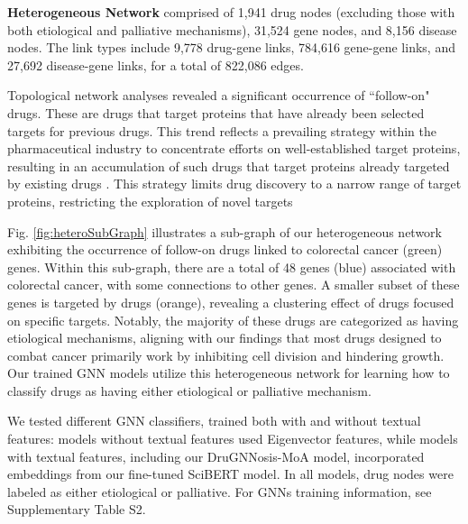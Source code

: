 \documentclass[journal,twoside,web]{ieeecolor}
\begin{document}
\textbf{Heterogeneous Network}
comprised of 1,941 drug nodes (excluding those with both etiological and palliative mechanisms), 31,524 gene nodes, and 8,156 disease nodes.
The link types include 9,778 drug-gene links, 784,616 gene-gene links, and 27,692 disease-gene links, for a total of 822,086 edges.

Topological network analyses revealed a significant occurrence of ``follow-on" drugs.
These are drugs that target proteins that have already been selected targets for previous drugs.
This trend reflects a prevailing strategy within the pharmaceutical industry to concentrate efforts on well-established target proteins, resulting in an accumulation of such drugs that target proteins already targeted by existing drugs \cite{aronson2020me}.
This strategy limits drug discovery to a narrow range of target proteins, restricting the exploration of novel targets

Fig. \ref{fig:heteroSubGraph} illustrates a sub-graph of our heterogeneous network exhibiting the occurrence of follow-on drugs linked to colorectal cancer (green) genes.
Within this sub-graph, there are a total of 48 genes (blue) associated with colorectal cancer, with some connections to other genes.
A smaller subset of these genes is targeted by drugs (orange), revealing a clustering effect of drugs focused on specific targets.
Notably, the majority of these drugs are categorized as having etiological mechanisms, aligning with our findings that most drugs designed to combat cancer primarily work by inhibiting cell division and hindering growth.
Our trained GNN models utilize this heterogeneous network for learning how to classify drugs as having either etiological or palliative mechanism.

We tested different GNN classifiers, trained both with and without textual features: models without textual features used Eigenvector features, while models with textual features, including our DruGNNosis-MoA model, incorporated embeddings from our fine-tuned SciBERT model.
In all models, drug nodes were labeled as either etiological or palliative.
For GNNs training information, see Supplementary Table S2. 
\end{document}
